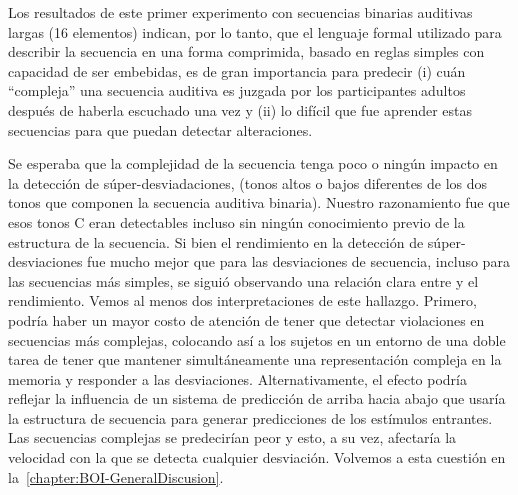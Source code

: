 Los resultados de este primer experimento con secuencias binarias auditivas largas (16 elementos) indican, por lo tanto, que el lenguaje formal utilizado para describir la secuencia en una forma comprimida, basado en reglas simples con capacidad de ser embebidas, es de gran importancia para predecir (i) cuán ``compleja'' una secuencia auditiva es juzgada por los participantes adultos después de haberla escuchado una vez y (ii) lo difícil que fue aprender estas secuencias para que puedan detectar alteraciones.


Se esperaba que la complejidad de la secuencia tenga poco o ningún impacto en la detección de súper-desviadaciones, (tonos altos o bajos diferentes de los dos tonos que componen la secuencia auditiva binaria). Nuestro razonamiento fue que esos tonos C eran detectables incluso sin ningún conocimiento previo de la estructura de la secuencia. Si bien el rendimiento en la detección de súper-desviaciones fue mucho mejor que para las desviaciones de secuencia, incluso para las secuencias más simples, se siguió observando una relación clara entre \mdlbin y el rendimiento. Vemos al menos dos interpretaciones de este hallazgo. Primero, podría haber un mayor costo de atención de tener que detectar violaciones en secuencias más complejas, colocando así a los sujetos en un entorno de una doble tarea de tener que mantener simultáneamente una representación compleja en la memoria y responder a las desviaciones. Alternativamente, el efecto podría reflejar la influencia de un sistema de predicción de arriba hacia abajo que usaría la estructura de secuencia para generar predicciones de los estímulos entrantes. Las secuencias complejas se predecirían peor y esto, a su vez, afectaría la velocidad con la que se detecta cualquier desviación. Volvemos a esta cuestión en la~\ref{chapter:BOI-GeneralDiscusion}.

